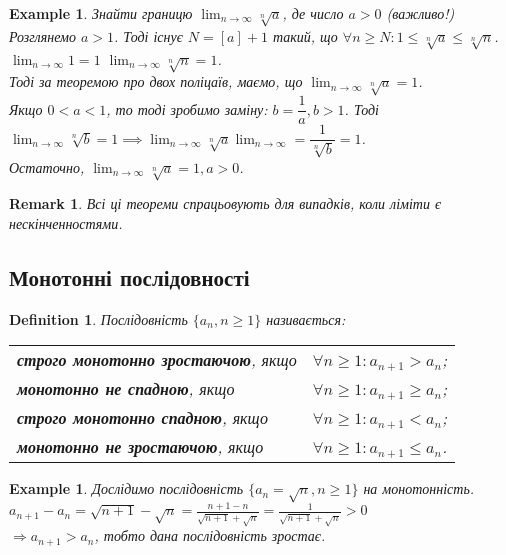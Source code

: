 \documentclass[a4paper, 14pt]{article}
\theoremstyle{theoremdd}
\theoremstyle{theoremdd}
\newtheorem{definition}[theorem]{Definition}
\theoremstyle{theoremdd}
\theoremstyle{theoremdd}
\newtheorem{example}[theorem]{Example}
\theoremstyle{theoremdd}
\theoremstyle{theoremdd}
\newtheorem{remark}[theorem]{Remark}
\theoremstyle{theoremdd}
\theoremstyle{theoremdd}
\begin{document}
	\begin{example}
	Знайти границю $\displaystyle\lim_{n \to \infty} \sqrt[n]{a}$, де число $a>0$ (важливо!)\\
	Розглянемо $a > 1$. Тоді існує $N = [a]+1$ такий, що $\forall n \geq N: 1 \leq \sqrt[n]{a} \leq \sqrt[n]{n}$.\\
	$\displaystyle\lim_{n \to \infty} 1 = 1$ \hspace{1cm} $\displaystyle\lim_{n \to \infty} \sqrt[n]{n} = 1$.\\
	Тоді за теоремою про двох поліцаїв, маємо, що $\displaystyle\lim_{n \to \infty} \sqrt[n]{a} = 1$.\\
	Якщо $0 < a < 1$, то тоді зробимо заміну: $b = \dfrac{1}{a}, b > 1$. Тоді \\ $\displaystyle\lim_{n \to \infty} \sqrt[n]{b} = 1 \implies \displaystyle\lim_{n \to \infty} \sqrt[n]{a} \displaystyle\lim_{n \to \infty} = \dfrac{1}{\sqrt[n]{b}} = 1$.\\
	Остаточно, $\displaystyle\lim_{n \to \infty} \sqrt[n]{a} = 1, a > 0$.
	\end{example}
	
	\begin{remark}
	Всі ці теореми спрацьовують для випадків, коли ліміти є нескінченностями.
	\end{remark}
	
	\subsection{Монотонні послідовності}
	\begin{definition}
	Послідовність $\{a_n, n \geq 1\}$ називається: \\
	\begin{tabular}{ll}
	\textbf{строго монотонно зростаючою}, якщо & $\forall n \geq 1: a_{n+1} > a_n$; \\
	\textbf{монотонно не спадною}, якщо & $\forall n \geq 1: a_{n+1} \geq a_n$; \\
	\textbf{строго монотонно спадною}, якщо & $\forall n \geq 1: a_{n+1} < a_n$; \\
	\textbf{монотонно не зростаючою}, якщо & $\forall n \geq 1: a_{n+1} \leq a_n$.
	\end{tabular}
	\end{definition}
	
	\begin{example}
	Дослідимо послідовність $\{a_n = \sqrt{n}, n \geq 1 \}$ на монотонність.\\
	$\displaystyle a_{n+1} - a_n = \sqrt{n+1} - \sqrt{n} = \frac{n+1-n}{\sqrt{n+1} + \sqrt{n}} = \frac{1}{\sqrt{n+1} + \sqrt{n}} > 0$\\
	$\Rightarrow a_{n+1}>a_n$, тобто дана послідовність зростає.
	\end{example}
	
\end{document}
